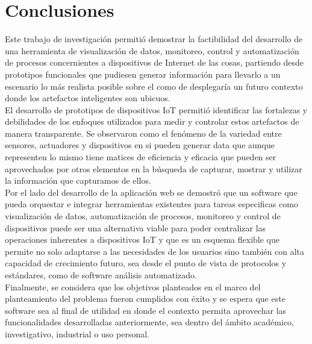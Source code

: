 

\chapter{Conclusiones}

Este trabajo de investigación permitió demostrar la factibilidad del desarrollo de una herramienta de visualización de datos, monitoreo, control y automatización de procesos concernientes a dispositivos de Internet de las cosas, partiendo desde prototipos funcionales que pudiesen generar información para llevarlo a un escenario lo más realista posible sobre el como de desplegaría un futuro contexto donde los artefactos inteligentes son ubicuos.\\

El desarrollo de prototipos de dispositivos IoT permitió identificar las fortalezas y debilidades de los enfoques utilizados para medir y controlar estos artefactos de manera transparente. Se observaron como el fenómeno de la variedad entre sensores, actuadores y dispositivos en si pueden generar data que aunque representen lo mismo tiene matices de eficiencia y eficacia que pueden ser aprovechados por otros elementos en la búsqueda de capturar, mostrar y utilizar la información que capturamos de ellos.\\

Por el lado del desarrollo de la aplicación web se demostró que un software que pueda orquestar e integrar herramientas existentes para tareas especificas como visualización de datos, automatización de procesos, monitoreo y control de dispositivos puede ser una alternativa viable para poder centralizar las operaciones inherentes a dispositivos IoT y que es un esquema flexible que permite no solo adaptarse a las necesidades de los usuarios sino también con alta capacidad de crecimiento futuro, sea desde el punto de vista de protocolos y estándares, como de software análisis automatizado.\\

Finalmente, se considera que los objetivos planteados en el marco del planteamiento del problema fueron cumplidos con éxito y se espera que este software sea al final de utilidad en donde el contexto permita aprovechar las funcionalidades desarrolladas anteriormente, sea dentro del ámbito académico, investigativo, industrial o uso personal.

